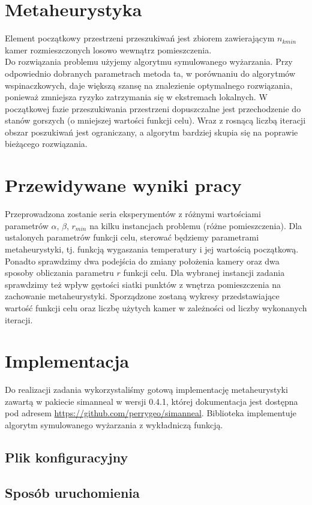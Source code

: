 \documentclass[12pt,a4paper]{article}
\begin{document}
\section{Metaheurystyka}
Element początkowy przestrzeni przeszukiwań jest zbiorem zawierającym $n_{kmin}$ kamer rozmieszczonych losowo wewnątrz pomieszczenia.\\
Do rozwiązania problemu użyjemy algorytmu symulowanego wyżarzania. Przy odpowiednio dobranych parametrach metoda ta, w porównaniu do algorytmów wspinaczkowych, daje większą szansę na znalezienie optymalnego rozwiązania, ponieważ zmniejsza ryzyko zatrzymania się w ekstremach lokalnych. W początkowej fazie przeszukiwania przestrzeni dopuszczalne jest przechodzenie do stanów gorszych (o mniejszej wartości funkcji celu). Wraz z rosnącą liczbą iteracji obszar poszukiwań jest ograniczany, a algorytm bardziej skupia się na poprawie bieżącego rozwiązania.

\section{Przewidywane wyniki pracy}
Przeprowadzona zostanie seria eksperymentów z różnymi wartościami parametrów $\alpha$, $\beta$, $r_{min}$ na kilku instancjach problemu (różne pomieszczenia). Dla ustalonych parametrów funkcji celu, sterować będziemy parametrami metaheurystyki, tj. funkcją wygaszania temperatury i jej
wartością początkową. Ponadto sprawdzimy dwa podejścia do zmiany położenia kamery oraz dwa sposoby obliczania parametru $r$ funkcji celu. Dla wybranej
instancji zadania sprawdzimy też wpływ gęstości siatki punktów z wnętrza
pomieszczenia na zachowanie metaheurystyki. Sporządzone zostaną wykresy przedstawiające wartość funkcji celu oraz liczbę użytych kamer w zależności od liczby wykonanych iteracji. 

\section{Implementacja}
Do realizacji zadania wykorzystaliśmy gotową implementację metaheurystyki zawartą w pakiecie simanneal w wersji 0.4.1,
której dokumentacja jest dostępna pod adresem \url{https://github.com/perrygeo/simanneal}.
Biblioteka implementuje algorytm symulowanego wyżarzania z wykładniczą funkcją.

\subsection{Plik konfiguracyjny}
\subsection{Sposób uruchomienia}
\end{document}
